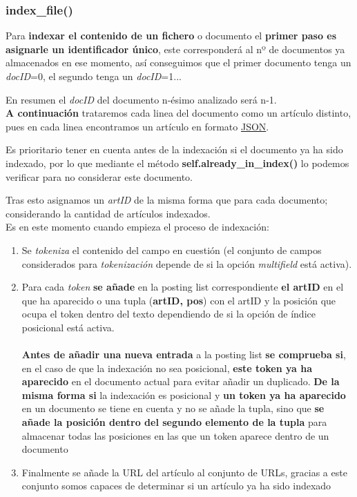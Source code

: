 \documentclass[12pt,a4paper]{article}
\begin{document}
\subsubsection{index\_file()}
Para \textbf{indexar el contenido de un fichero} o documento el \textbf{primer paso es asignarle un identificador único}, este corresponderá al nº de documentos ya almacenados en ese momento, así conseguimos que el primer documento tenga un \textit{docID}=0, el segundo tenga un \textit{docID}=1... 

En resumen el \textit{docID} del documento n-ésimo analizado será n-1.\\

\textbf{A continuación} trataremos cada linea del documento como un artículo distinto, pues en cada linea encontramos un artículo en formato \href{https://en.wikipedia.org/wiki/JSON}{JSON}.

Es prioritario tener en cuenta antes de la indexación si el documento ya ha sido indexado, por lo que mediante el método \textbf{self.already\_in\_index()} lo podemos verificar para no considerar este documento.

Tras esto asignamos un \textit{artID} de la misma forma que para cada documento; considerando la cantidad de artículos indexados.\\

Es en este momento cuando empieza el proceso de indexación:

\begin{enumerate}
  \item Se \textit{tokeniza} el contenido del campo en cuestión (el conjunto de campos considerados para \textit{tokenización} depende de si la opción \textit{multifield} está activa).
  \item Para cada \textit{token} \textbf{se añade} en la posting list correspondiente \textbf{el artID} en el que ha aparecido o una tupla (\textbf{artID, pos}) con el artID y la posición que ocupa el token dentro del texto dependiendo de si la opción de índice posicional está activa. \\ \\
  \textbf{Antes de añadir una nueva entrada} a la posting list \textbf{se comprueba si}, en el caso de que la indexación no sea posicional, \textbf{este token ya ha aparecido} en el documento actual para evitar añadir un duplicado. \textbf{De la misma forma si} la indexación es posicional y \textbf{un token ya ha aparecido} en un documento se tiene en cuenta y no se añade la tupla, sino que \textbf{se añade la posición dentro del segundo elemento de la tupla} para almacenar todas las posiciones en las que un token aparece dentro de un documento
  \item Finalmente se añade la URL del artículo al conjunto de URLs, gracias a este conjunto somos capaces de determinar si un artículo ya ha sido indexado
\end{enumerate}
\end{document}
